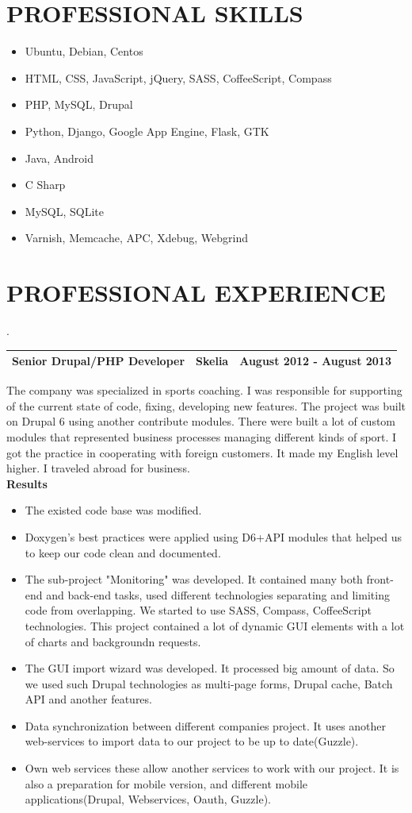 \documentclass[11pt]{article}
\newcommand{\companyheader}[3]{
	. \\[10mm]
	\begin{tabularx}{\textwidth}{|X|l|r|}
		\hline
			{#1} & \bfseries{#2} & {#3} \\
		\hline
	\end{tabularx}
}
\begin{document}
		\section*{PROFESSIONAL SKILLS}
		\begin{itemize}
			\item Ubuntu, Debian, Centos
			\item HTML, CSS, JavaScript, jQuery, SASS, CoffeeScript, Compass
			\item PHP, MySQL, Drupal
			\item Python, Django, Google App Engine, Flask, GTK
			\item Java, Android
			\item C Sharp
			\item MySQL, SQLite
			\item Varnish, Memcache, APC, Xdebug, Webgrind
		\end{itemize}
		
		\section*{PROFESSIONAL EXPERIENCE}
		\companyheader{Senior Drupal/PHP Developer}{Skelia}{August 2012 - August 2013}
		The company was specialized in sports coaching. I was responsible for supporting of the current state of code, fixing, developing new features. The project was built on Drupal 6 using another contribute modules. There were built a lot of custom modules that represented business processes managing different kinds of sport. I got the practice in cooperating with foreign customers. It made my English level higher. I traveled abroad for business.
		\\ \textbf{Results} \\
		\begin{itemize}
			\item The existed code base was modified.
			\item Doxygen's best practices were applied using D6+API modules that helped us to keep our code clean and documented.
	\item The sub-project "Monitoring" was developed. It contained many both front-end and back-end tasks, used different technologies separating and limiting
code from overlapping. We started to use SASS, Compass, CoffeeScript technologies. This project contained a lot of dynamic GUI elements with a lot of charts and backgroundn requests.
	\item The GUI import wizard was developed. It processed big amount of data. So we used such Drupal technologies as multi-page forms, Drupal cache, Batch API and
another features.
	\item Data synchronization between different companies project. It
uses another web-services to import data to our project to be up to
date(Guzzle).
	\item Own web services these allow another services to work with our
project. It is also a preparation for mobile version, and different mobile
applications(Drupal, Webservices, Oauth, Guzzle). \\
		\end{itemize}
		
\end{document}
